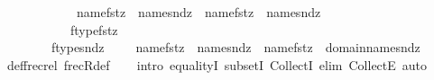 \begin{isabellebody}
\ \ \ \ \ \ \ \ \ \ \ \ {\isacharparenleft}{\kern0pt}name{}{\isacharparenleft}{\kern0pt}fst{\isacharparenleft}{\kern0pt}z{\isacharparenright}{\kern0pt}{\isacharparenright}{\kern0pt}\ {\isacharequal}{\kern0pt}\ name{}{\isacharparenleft}{\kern0pt}snd{\isacharparenleft}{\kern0pt}z{\isacharparenright}{\kern0pt}{\isacharparenright}{\kern0pt}\ {\isasymor}\ name{}{\isacharparenleft}{\kern0pt}fst{\isacharparenleft}{\kern0pt}z{\isacharparenright}{\kern0pt}{\isacharparenright}{\kern0pt}\ {\isacharequal}{\kern0pt}\ name{}{\isacharparenleft}{\kern0pt}snd{\isacharparenleft}{\kern0pt}z{\isacharparenright}{\kern0pt}{\isacharparenright}{\kern0pt}{\isacharparenright}{\kern0pt}\ \isanewline
\ \ \ \ \ \ \ \ \ \ {\isasymor}\ {\isacharparenleft}{\kern0pt}ftype{\isacharparenleft}{\kern0pt}fst{\isacharparenleft}{\kern0pt}z{\isacharparenright}{\kern0pt}{\isacharparenright}{\kern0pt}\ {\isacharequal}{\kern0pt}\ {}\ {\isasymand}\ \isanewline
\ \ \ \ \ \ \ \ ftype{\isacharparenleft}{\kern0pt}snd{\isacharparenleft}{\kern0pt}z{\isacharparenright}{\kern0pt}{\isacharparenright}{\kern0pt}\ {\isacharequal}{\kern0pt}\ {}\ {\isasymand}\ \ name{}{\isacharparenleft}{\kern0pt}fst{\isacharparenleft}{\kern0pt}z{\isacharparenright}{\kern0pt}{\isacharparenright}{\kern0pt}\ {\isacharequal}{\kern0pt}\ name{}{\isacharparenleft}{\kern0pt}snd{\isacharparenleft}{\kern0pt}z{\isacharparenright}{\kern0pt}{\isacharparenright}{\kern0pt}\ {\isasymand}\ name{}{\isacharparenleft}{\kern0pt}fst{\isacharparenleft}{\kern0pt}z{\isacharparenright}{\kern0pt}{\isacharparenright}{\kern0pt}\ {\isasymin}\ domain{\isacharparenleft}{\kern0pt}name{}{\isacharparenleft}{\kern0pt}snd{\isacharparenleft}{\kern0pt}z{\isacharparenright}{\kern0pt}{\isacharparenright}{\kern0pt}{\isacharparenright}{\kern0pt}{\isacharparenright}{\kern0pt}{\isacharbraceright}{\kern0pt}{\isachardoublequoteclose}\isanewline
%
\isadelimproof
\ \ %
\endisadelimproof
%
\isatagproof
{}\isamarkupfalse%
\ def{\isacharunderscore}{\kern0pt}frecrel\ frecR{\isacharunderscore}{\kern0pt}def\isanewline
\ \ \isamarkupfalse%
\ {\isacharparenleft}{\kern0pt}intro\ equalityI\ subsetI\ CollectI{\isacharsemicolon}{\kern0pt}\ elim\ CollectE{\isacharsemicolon}{\kern0pt}\ auto{\isacharparenright}{\kern0pt}%
\endisatagproof
{\isafoldproof}%
%
\isadelimproof
\isanewline
%
\endisadelimproof
%
\isadelimtheory
\isanewline
%
\endisadelimtheory
%
\isatagtheory
{}\isamarkupfalse%
%
\endisatagtheory
{\isafoldtheory}%
%
\isadelimtheory
%
\endisadelimtheory
%
\end{isabellebody}%
